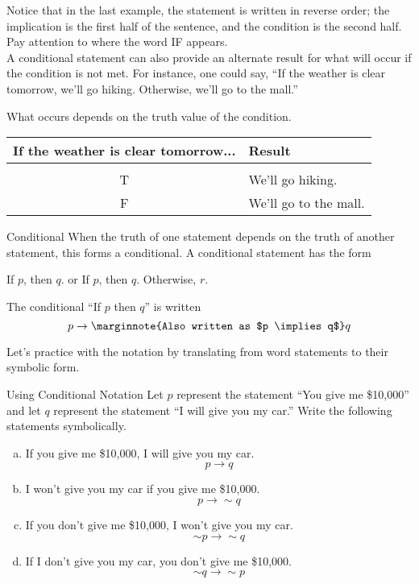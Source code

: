 Notice that in the last example, the statement is written in reverse order; the implication is the first half of the sentence, and the condition is the second half.  Pay attention to where the word IF appears.\\

A conditional statement can also provide an alternate result for what will occur if the condition is not met.  For instance, one could say, ``If the weather is clear tomorrow, we'll go hiking.  Otherwise, we'll go to the mall.''

What occurs depends on the truth value of the condition.
\begin{center}
\begin{tabular}{c l}
If the weather is clear tomorrow... & Result\\
\hline
& \\
T & We'll go hiking.\\
F & We'll go to the mall.
\end{tabular}
\end{center}

\begin{proc}{Conditional}
When the truth of one statement depends on the truth of another statement, this forms a conditional.  A conditional statement has the form 
\begin{center}
If $p$, then $q$. \hspace{0.25in} or \hspace{0.25in} If $p$, then $q$.  Otherwise, $r$.\\
\end{center}

The conditional ``If $p$ then $q$'' is written
\[p \to\marginnote{Also written as $p \implies q$} q\]
\end{proc}

\vfill
\pagebreak

Let's practice with the notation by translating from word statements to their symbolic form.

\begin{example}[https://www.youtube.com/watch?v=_rnB6rre2zM]{Using Conditional Notation}
Let $p$ represent the statement ``You give me \$10,000'' and let $q$ represent the statement ``I will give you my car.''  Write the following statements symbolically.

\begin{enumerate}[(a)]
\item If you give me \$10,000, I will give you my car.
\[p \to q\]

\item I won't give you my car if you give me \$10,000.
\[p \to \sim q\]

\item If you don't give me \$10,000, I won't give you my car.
\[\sim p \to \sim q\]

\item If I don't give you my car, you don't give me \$10,000.
\[\sim q \to \sim p\]
\end{enumerate}
\end{example}

